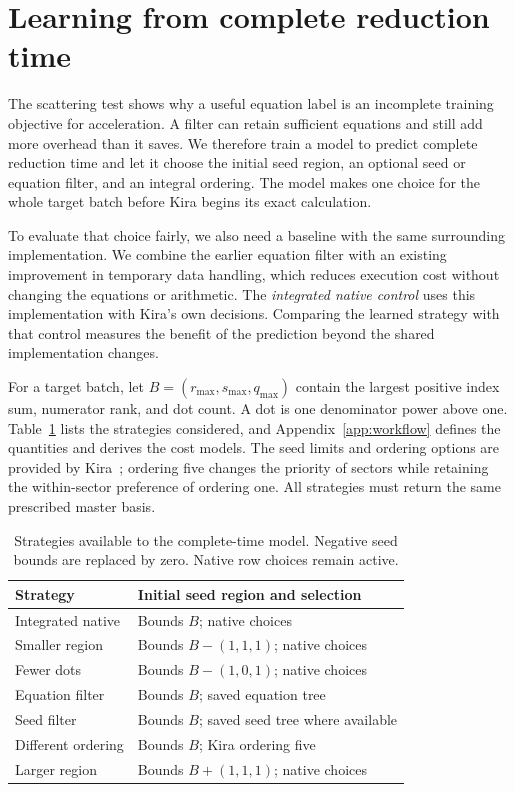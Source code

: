 \providecommand{\StudySection}{\section}
\providecommand{\StudySubsection}{\subsection}

\StudySection{Learning from complete reduction time}
\label{sec:workflow}
The scattering test shows why a useful equation label is an incomplete training objective for acceleration. A filter can retain sufficient equations and still add more overhead than it saves. We therefore train a model to predict complete reduction time and let it choose the initial seed region, an optional seed or equation filter, and an integral ordering. The model makes one choice for the whole target batch before Kira begins its exact calculation.

To evaluate that choice fairly, we also need a baseline with the same surrounding implementation. We combine the earlier equation filter with an existing improvement in temporary data handling, which reduces execution cost without changing the equations or arithmetic. The \emph{integrated native control} uses this implementation with Kira's own decisions. Comparing the learned strategy with that control measures the benefit of the prediction beyond the shared implementation changes.

For a target batch, let $B=(r_{\max},s_{\max},q_{\max})$ contain the largest positive index sum, numerator rank, and dot count. A dot is one denominator power above one. Table~\ref{tab:workflow-actions} lists the strategies considered, and Appendix~\ref{app:workflow} defines the quantities and derives the cost models. The seed limits and ordering options are provided by Kira~\cite{Kira12}; ordering five changes the priority of sectors while retaining the within-sector preference of ordering one. All strategies must return the same prescribed master basis.

\begin{table}[!htbp]
\centering\small
\caption{Strategies available to the complete-time model. Negative seed
bounds are replaced by zero. Native row choices remain active.}
\label{tab:workflow-actions}
\begin{tabular}{@{}ll@{}}\toprule
Strategy & Initial seed region and selection\\\midrule
Integrated native & Bounds $B$; native choices\\
Smaller region & Bounds $B-(1,1,1)$; native choices\\
Fewer dots & Bounds $B-(1,0,1)$; native choices\\
Equation filter & Bounds $B$; saved equation tree\\
Seed filter & Bounds $B$; saved seed tree where available\\
Different ordering & Bounds $B$; Kira ordering five\\
Larger region & Bounds $B+(1,1,1)$; native choices\\\bottomrule
\end{tabular}
\end{table}

